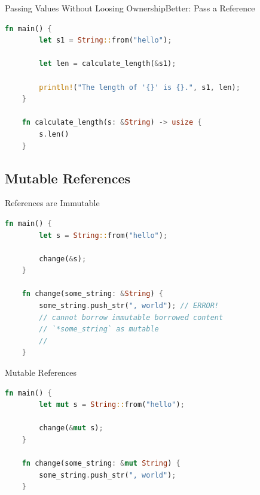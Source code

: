 \begin{Frame}[fragile,t]{Passing Values Without Loosing Ownership}{Better: Pass a Reference}
  \begin{lstlisting}[language=Rust,gobble=4]
    fn main() {
        let s1 = String::from("hello");

        let len = calculate_length(&s1);

        println!("The length of '{}' is {}.", s1, len);
    }

    fn calculate_length(s: &String) -> usize {
        s.len()
    }
  \end{lstlisting}

  \pause

\end{Frame}

\subsection{Mutable References}

\begin{Frame}[fragile,t]{References are Immutable}
  \begin{lstlisting}[language=Rust,gobble=4]
    fn main() {
        let s = String::from("hello");

        change(&s);
    }

    fn change(some_string: &String) {
        some_string.push_str(", world"); // ERROR!
        // cannot borrow immutable borrowed content
        // `*some_string` as mutable
        // 
    }
  \end{lstlisting}
\end{Frame}

\begin{Frame}[fragile,t]{Mutable References}
  \begin{lstlisting}[language=Rust,gobble=4]
    fn main() {
        let mut s = String::from("hello");

        change(&mut s);
    }

    fn change(some_string: &mut String) {
        some_string.push_str(", world");
    }
  \end{lstlisting}
\end{Frame}

